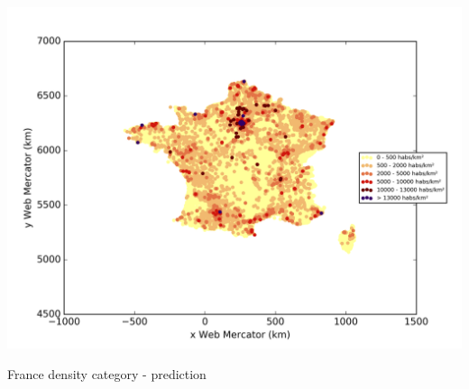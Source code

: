 \documentclass[c]{beamer}
\begin{document}
\begin{frame}
\begin{columns}
\begin{column}{0.5\textwidth}
\begin{overlayarea}{\linewidth}{4cm}
    \includegraphics[scale=0.25]{../../data/France/test/Support_Vector_Gaussian_Classification/Support_Vector_Gaussian_Classification/density_classification.png}
  \end{overlayarea}
  \begin{overlayarea}{\linewidth}{0.5cm}
    \centering
    \tiny France density category - prediction\par
  \end{overlayarea}
 \end{column}
\end{columns}


\end{frame}
\end{document}
